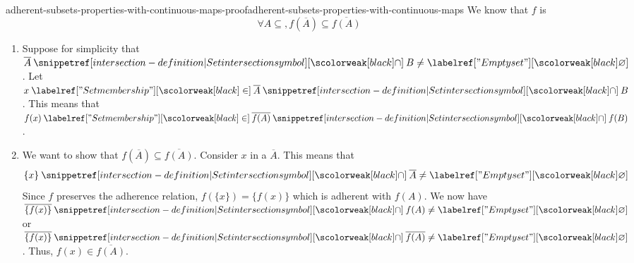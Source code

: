 \documentclass[preview]{standalone}
\begin{document}
\begin{snippetproof}{adherent-subsets-properties-with-continuous-maps-proof}{adherent-subsets-properties-with-continuous-maps}{}
    We know that \(f\) is \topologycontinuous \ifandonlyif 
    \[
        \forall A \subseteq, f(\overline{A}) \subseteq \overline{f(A)}
    \]
    \begin{enumerate}
        \item Suppose for simplicity that \(\overline{A} \intersection B \neq \emptyset\).
        Let \(x\in \overline{A} \intersection B\).
        This means that \(f(x) \in \overline{f(A)} \intersection f(B)\).
        \item We want to show that \(f(\overline{A}) \subseteq \overline{f(A)}\).
        Consider \(x\) in a \closedset \(\overline{A}\). This means that
        \[
            \{x\} \intersection \overline{A} \neq \emptyset
        \]
        Since \(f\) preserves the adherence relation, \(f(\{x\}) = \{f(x)\}\)
        which is adherent with \(f(A)\).
        We now have \(\overline{\{f(x)\}} \intersection f(A) \neq \emptyset\)
        or  \(\overline{\{f(x)\}} \intersection \overline{f(A)} \neq \emptyset\).
        Thus, \(f(x) \in \overline{f(A)}\).
    \end{enumerate}
\end{snippetproof}
\end{document}
